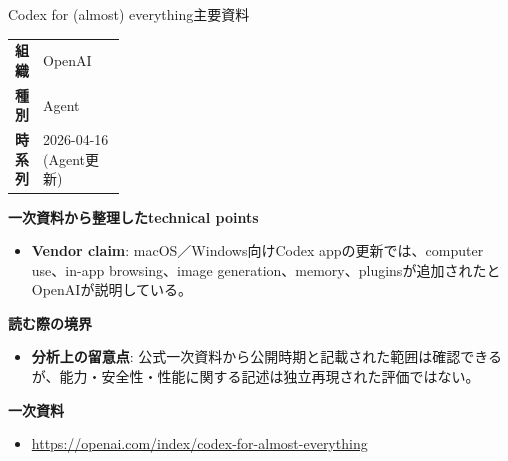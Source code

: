 \begin{technicalnote}{Codex for (almost) everything}{主要資料}
\begingroup
\begin{tabularx}{\linewidth}{@{}>{\bfseries}p{0.22\linewidth}X@{}}
組織 & OpenAI \\
種別 & Agent \\
時系列 & 2026-04-16 (Agent更新) \\
\end{tabularx}
\smallskip
{\bfseries 一次資料から整理したtechnical points}
\begin{itemize}[leftmargin=1.5em,itemsep=0.35em]
\item \textbf{Vendor claim}: macOS／Windows向けCodex appの更新では、computer use、in-app browsing、image generation、memory、pluginsが追加されたとOpenAIが説明している。
\end{itemize}
{\bfseries 読む際の境界}
\begin{itemize}[leftmargin=1.5em,itemsep=0.35em]
\item \textbf{分析上の留意点}: 公式一次資料から公開時期と記載された範囲は確認できるが、能力・安全性・性能に関する記述は独立再現された評価ではない。
\end{itemize}
\begin{samepage}
{\bfseries 一次資料}
\begingroup\sloppy
\begin{itemize}[leftmargin=1.5em,itemsep=0.25em]
\item {\scriptsize\url{https://openai.com/index/codex-for-almost-everything}}
\end{itemize}
\endgroup
\end{samepage}
\endgroup
\end{technicalnote}
\medskip

